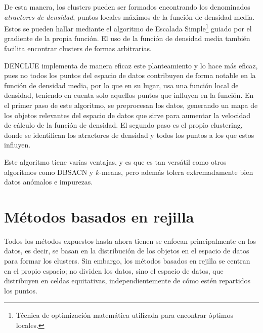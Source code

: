 \documentclass[10pt, a4paper]{article}
\begin{document}
De esta manera, los clusters pueden ser formados encontrando los denominados \textit{atractores de densidad}, puntos locales máximos de la función de densidad media. Estos se pueden hallar mediante el algoritmo de Escalada Simple\footnote{Técnica de optimización matemática utilizada para encontrar óptimos locales.} guiado por el gradiente de la propia función. El uso de la función de densidad media también facilita encontrar clusters de formas arbitrarias.

DENCLUE implementa de manera eficaz este planteamiento y lo hace más eficaz, pues no todos los puntos del espacio de datos contribuyen de forma notable en la función de densidad media, por lo que en su lugar, usa una función local de densidad, teniendo en cuenta solo aquellos puntos que influyen en la función. En el primer paso de este algoritmo, se preprocesan los datos, generando un mapa de los objetos relevantes del espacio de datos que sirve para aumentar la velocidad de cálculo de la función de densidad. El segundo paso es el propio clustering, donde se identifican los atractores de densidad y todos los puntos a los que estos influyen.

Este algoritmo tiene varias ventajas, y es que es tan versátil como otros algoritmos como DBSACN y $k$-means, pero además tolera extremadamente bien datos anómalos e impurezas.




\section{Métodos basados en rejilla} \label{sec:Métodos basados en rejilla}

\cite{LIBRO} Todos los métodos expuestos hasta ahora tienen se enfocan principalmente en los datos, es decir, se basan en la distribución de los objetos en el espacio de datos para formar los clusters. Sin embargo, los métodos basados en rejilla se centran en el propio espacio; no dividen los datos, sino el espacio de datos, que distribuyen en celdas equitativas, independientemente de cómo estén repartidos los puntos.
\end{document}
